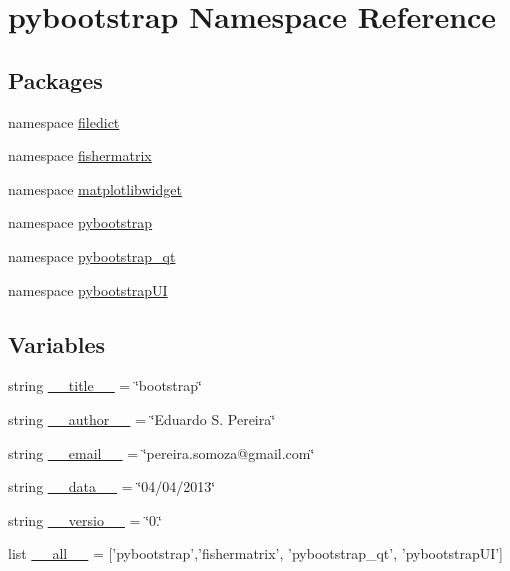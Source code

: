 \hypertarget{namespacepybootstrap}{\section{pybootstrap Namespace Reference}
\label{namespacepybootstrap}
}
\subsection*{Packages}
\begin{DoxyCompactItemize}
\item 
namespace \hyperlink{namespacepybootstrap_1_1filedict}{filedict}
\item 
namespace \hyperlink{namespacepybootstrap_1_1fishermatrix}{fishermatrix}
\item 
namespace \hyperlink{namespacepybootstrap_1_1matplotlibwidget}{matplotlibwidget}
\item 
namespace \hyperlink{namespacepybootstrap_1_1pybootstrap}{pybootstrap}
\item 
namespace \hyperlink{namespacepybootstrap_1_1pybootstrap__qt}{pybootstrap\-\_\-qt}
\item 
namespace \hyperlink{namespacepybootstrap_1_1pybootstrapUI}{pybootstrap\-U\-I}
\end{DoxyCompactItemize}
\subsection*{Variables}
\begin{DoxyCompactItemize}
\item 
string \hyperlink{namespacepybootstrap_ae83fb4023f37c903782994fef71a6be8}{\-\_\-\-\_\-title\-\_\-\-\_\-} = \char`\"{}bootstrap\char`\"{}
\item 
string \hyperlink{namespacepybootstrap_af7167417e6f63a0890fbf85462a8ddf5}{\-\_\-\-\_\-author\-\_\-\-\_\-} = \char`\"{}Eduardo S. Pereira\char`\"{}
\item 
string \hyperlink{namespacepybootstrap_adf1f400664b70c276af308e8fdc68341}{\-\_\-\-\_\-email\-\_\-\-\_\-} = \char`\"{}pereira.\-somoza@gmail.\-com\char`\"{}
\item 
string \hyperlink{namespacepybootstrap_ad8af445e8f3ec570d97b1a6c2d183174}{\-\_\-\-\_\-data\-\_\-\-\_\-} = \char`\"{}04/04/2013\char`\"{}
\item 
string \hyperlink{namespacepybootstrap_a22aa032b81828be7273a601c21507057}{\-\_\-\-\_\-versio\-\_\-\-\_\-} = \char`\"{}0.\char`\"{}
\item 
list \hyperlink{namespacepybootstrap_a04c80a96840afaecf2d51ee082500950}{\-\_\-\-\_\-all\-\_\-\-\_\-} = \mbox{[}'pybootstrap','fishermatrix', 'pybootstrap\-\_\-qt', 'pybootstrap\-U\-I'\mbox{]}
\end{DoxyCompactItemize}


